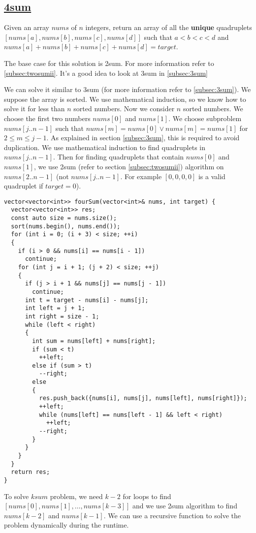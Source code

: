 \documentclass{book}
\begin{document}
	\subsection{\href{https://leetcode.com/problems/4sum/}{4sum}}
	\label{subsec:4sum}
	Given an array $nums$ of $n$ integers, return an array of all the \textbf{unique} quadruplets $[nums[a], nums[b], nums[c], nums[d]]$ such that $a < b < c < d$ and $nums[a] + nums[b] + nums[c] + nums[d] = target$.
	\par The base case for this solution is 2sum. For more information refer to \ref{subsec:twosumii}. It's a good idea to look at 3sum in \ref{subsec:3sum}
	\par We can solve it similar to 3sum (for more information refer to \ref{subsec:3sum}). We suppose the array is sorted. We use mathematical induction, so we know how to solve it for less than $n$ sorted numbers. Now we consider $n$ sorted numbers. We choose the first two numbers $nums[0]$ and $nums[1]$. We choose subproblem $nums[j..n - 1]$ such that $nums[m] = nums[0] \lor nums[m] = nums[1]$ for $2 \le m \le j - 1$. As explained in section \ref{subsec:3sum}, this is required to avoid duplication. We use mathematical induction to find quadruplets in $nums[j..n - 1]$. Then for finding quadruplets that contain $nums[0]$ and $nums[1]$, we use 2sum (refer to section \ref{subsec:twosumii}) algorithm on $nums[2..n-1]$ (not $nums[j..n - 1]$. For example $[0, 0, 0, 0]$ is a valid quadruplet if $target=0$).
	\begin{lstlisting}
vector<vector<int>> fourSum(vector<int>& nums, int target) {
  vector<vector<int>> res;
  const auto size = nums.size();
  sort(nums.begin(), nums.end());
  for (int i = 0; (i + 3) < size; ++i)
  {
    if (i > 0 && nums[i] == nums[i - 1])
      continue;
    for (int j = i + 1; (j + 2) < size; ++j)
    {
      if (j > i + 1 && nums[j] == nums[j - 1])
        continue;
      int t = target - nums[i] - nums[j];
      int left = j + 1;
      int right = size - 1;
      while (left < right)
      {
        int sum = nums[left] + nums[right];
        if (sum < t)
          ++left;
        else if (sum > t)
          --right;
        else
        {
          res.push_back({nums[i], nums[j], nums[left], nums[right]});
          ++left;
          while (nums[left] == nums[left - 1] && left < right)
            ++left;
          --right;
        }
      }
    }
  }
  return res;
}
	\end{lstlisting}
	To solve $ksum$ problem, we need $k - 2$ for loops to find $[nums[0], nums[1], \dots, nums[k - 3]]$ and we use 2sum algorithm to find $nums[k - 2]$ and $nums[k - 1]$. We can use a recursive function to solve the problem dynamically during the runtime.
\end{document}
